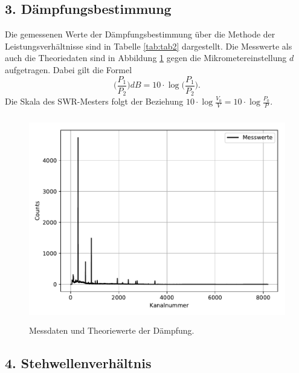 \subsection{3. Dämpfungsbestimmung}

Die gemessenen Werte der Dämpfungsbestimmung über die Methode der Leistungsverhältnisse sind
in Tabelle \ref{tab:tab2} dargestellt. Die Messwerte als auch die Theoriedaten sind in Abbildung \ref{fig:plot1}
gegen die Mikrometereinstellung $d$ aufgetragen. Dabei gilt die Formel
\begin{equation}
  \Big(\frac{P_1}{P_2}\Big)\si{dB}=10\cdot\log\Big(\frac{P_1}{P_2}\Big).
\end{equation}
Die Skala des SWR-Mesters folgt der Beziehung $10\cdot\log\frac{V_0}{V}=10\cdot\log\frac{P_0}{P}$.



\begin{figure}
  \centering
  \includegraphics[height=9cm]{plot1.pdf}
  \caption{Messdaten und Theoriewerte der Dämpfung.}
  \label{fig:plot1}
\end{figure}

\subsection{4. Stehwellenverhältnis}

